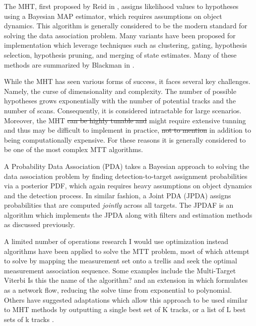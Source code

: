 \documentclass[journal]{IEEEtran}
\begin{document}
The MHT, first proposed by Reid in \cite{MHT-Seminal}, assigns likelihood values to hypotheses using a Bayesian MAP estimator, which requires assumptions on object dynamics. This algorithm is generally considered to be the modern standard for solving the data association problem. Many variants have been proposed for implementation which leverage techniques such as clustering, gating, hypothesis selection, hypothesis pruning, and merging of state estimates. Many of these methods are summarized by Blackman in \cite{MHT-Overview}. 

While the MHT has seen various forms of success, it faces several key challenges. Namely, the curse of dimensionality and complexity. The number of possible hypotheses grows exponentially with the number of potential tracks and the number of scans. Consequently, it is considered intractable for large scenarios. Moreover, the MHT {\color{red} \sout{can be highly tunable and } might require extensive tunning and thus may be} difficult to implement in practice, {\color{red} \sout{not to mention} in addition to being} computationally expensive. For these reasons it is generally considered to be one of the most complex MTT algorithms. 

A Probability Data Association (PDA) takes a Bayesian approach to solving the data association problem by finding detection-to-target assignment probabilities via a posterior PDF, which again requires heavy assumptions on object dynamics and the detection process. In similar fashion, a Joint PDA (JPDA) assigns probabilities that are computed \textit{jointly} across all targets. The JPDAF is an algorithm which implements the JPDA along with filters and estimation methods as discussed previously. \cite{Bar-Shalom_MTT} 

A limited number of operations research {\color{red} I would use optimization instead} algorithms have been applied to solve the MTT problem, most of which attempt to solve by mapping the measurement set onto a trellis and seek the optimal measurement association sequence. Some examples include the Multi-Target Viterbi {\color{red} Is this the name of the algorithm?} \cite{Viterbi-1} and an extension in \cite{Viterbi-2} which formulates \cite{Viterbi-1} as a network flow, reducing the solve time from exponential to polynomial. Others have suggested adaptations which allow this approach to be used similar to MHT methods by outputting a single best set of K tracks, or a list of L best sets of k tracks \cite{Viterbi-3}. 
\end{document}
